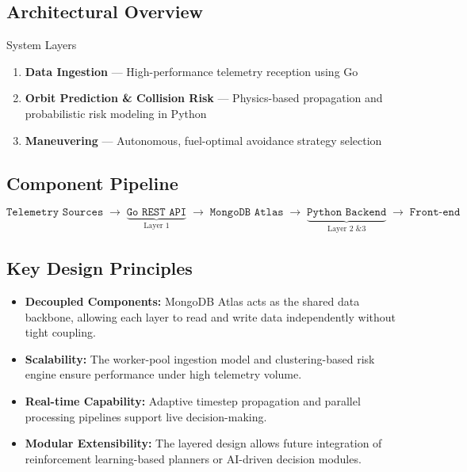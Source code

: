 \documentclass[11pt, a4paper]{article}
\begin{document}
\subsection{Architectural Overview}

\begin{layerbox}{System Layers}
\begin{enumerate}[leftmargin=1.5cm, label=\textbf{Layer \arabic*.}]
  \item \textbf{Data Ingestion} --- High-performance telemetry reception using Go
  \item \textbf{Orbit Prediction \& Collision Risk} --- Physics-based propagation and probabilistic risk modeling in Python
  \item \textbf{Maneuvering} --- Autonomous, fuel-optimal avoidance strategy selection
\end{enumerate}
\end{layerbox}

\subsection{Component Pipeline}

\[
\texttt{Telemetry Sources}
\;\longrightarrow\;
\underbrace{\texttt{Go REST API}}_{\text{Layer 1}}
\;\longrightarrow\;
\texttt{MongoDB Atlas}
\;\longrightarrow\;
\underbrace{\texttt{Python Backend}}_{\text{Layer 2 \& 3}}
\;\longrightarrow\;
\texttt{Front-end}
\]

\subsection{Key Design Principles}

\begin{itemize}[leftmargin=1.5cm]
  \item \textbf{Decoupled Components:} MongoDB Atlas acts as the shared data backbone, allowing each layer to read and write data independently without tight coupling.
  \item \textbf{Scalability:} The worker-pool ingestion model and clustering-based risk engine ensure performance under high telemetry volume.
  \item \textbf{Real-time Capability:} Adaptive timestep propagation and parallel processing pipelines support live decision-making.
  \item \textbf{Modular Extensibility:} The layered design allows future integration of reinforcement learning-based planners or AI-driven decision modules.
\end{itemize}
\end{document}

